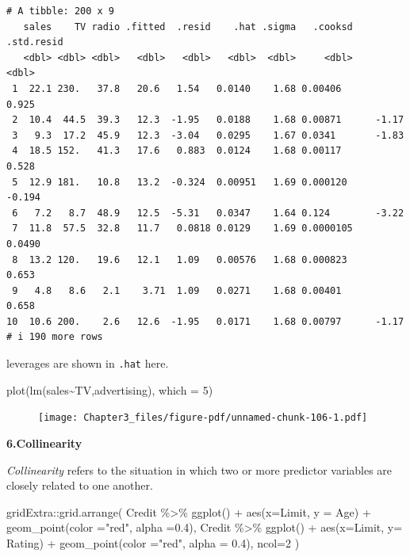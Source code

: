 \documentclass[
  letterpaper,
  DIV=11,
  numbers=noendperiod]{scrreprt}
\newenvironment{Shaded}{\begin{snugshade}}{\end{snugshade}}
\newcommand{\AttributeTok}[1]{\textcolor[rgb]{0.65,0.35,0.00}{#1}}
\newcommand{\DecValTok}[1]{\textcolor[rgb]{0.47,0.16,0.63}{#1}}
\newcommand{\FloatTok}[1]{\textcolor[rgb]{0.65,0.35,0.00}{#1}}
\newcommand{\FunctionTok}[1]{\textcolor[rgb]{0.02,0.16,0.49}{#1}}
\newcommand{\NormalTok}[1]{\textcolor[rgb]{0.33,0.33,0.33}{#1}}
\newcommand{\SpecialCharTok}[1]{\textcolor[rgb]{0.00,0.46,0.62}{#1}}
\newcommand{\StringTok}[1]{\textcolor[rgb]{0.00,0.50,0.00}{#1}}
\begin{document}
\begin{verbatim}
# A tibble: 200 x 9
   sales    TV radio .fitted  .resid    .hat .sigma   .cooksd .std.resid
   <dbl> <dbl> <dbl>   <dbl>   <dbl>   <dbl>  <dbl>     <dbl>      <dbl>
 1  22.1 230.   37.8   20.6   1.54   0.0140    1.68 0.00406       0.925 
 2  10.4  44.5  39.3   12.3  -1.95   0.0188    1.68 0.00871      -1.17  
 3   9.3  17.2  45.9   12.3  -3.04   0.0295    1.67 0.0341       -1.83  
 4  18.5 152.   41.3   17.6   0.883  0.0124    1.68 0.00117       0.528 
 5  12.9 181.   10.8   13.2  -0.324  0.00951   1.69 0.000120     -0.194 
 6   7.2   8.7  48.9   12.5  -5.31   0.0347    1.64 0.124        -3.22  
 7  11.8  57.5  32.8   11.7   0.0818 0.0129    1.69 0.0000105     0.0490
 8  13.2 120.   19.6   12.1   1.09   0.00576   1.68 0.000823      0.653 
 9   4.8   8.6   2.1    3.71  1.09   0.0271    1.68 0.00401       0.658 
10  10.6 200.    2.6   12.6  -1.95   0.0171    1.68 0.00797      -1.17  
# i 190 more rows
\end{verbatim}

leverages are shown in \texttt{.hat} here.

\begin{Shaded}
\begin{Highlighting}[]
\FunctionTok{plot}\NormalTok{(}\FunctionTok{lm}\NormalTok{(sales}\SpecialCharTok{\textasciitilde{}}\NormalTok{TV,advertising), }\AttributeTok{which =} \DecValTok{5}\NormalTok{)}
\end{Highlighting}
\end{Shaded}

\begin{figure}[H]

{\centering \texttt{[image: Chapter3\_files/figure-pdf/unnamed-chunk-106-1.pdf]}

}

\end{figure}

\textbf{6.Collinearity}

\emph{Collinearity} refers to the situation in which two or more
predictor variables are closely related to one another.

\begin{Shaded}
\begin{Highlighting}[]
\NormalTok{gridExtra}\SpecialCharTok{::}\FunctionTok{grid.arrange}\NormalTok{(}
\NormalTok{  Credit }\SpecialCharTok{\%\textgreater{}\%} \FunctionTok{ggplot}\NormalTok{() }\SpecialCharTok{+} \FunctionTok{aes}\NormalTok{(}\AttributeTok{x=}\NormalTok{Limit, }\AttributeTok{y =}\NormalTok{ Age) }\SpecialCharTok{+} \FunctionTok{geom\_point}\NormalTok{(}\AttributeTok{color =}\StringTok{"red"}\NormalTok{, }\AttributeTok{alpha =}\FloatTok{0.4}\NormalTok{),}
\NormalTok{  Credit }\SpecialCharTok{\%\textgreater{}\%} \FunctionTok{ggplot}\NormalTok{() }\SpecialCharTok{+} \FunctionTok{aes}\NormalTok{(}\AttributeTok{x=}\NormalTok{Limit, }\AttributeTok{y=}\NormalTok{ Rating) }\SpecialCharTok{+} \FunctionTok{geom\_point}\NormalTok{(}\AttributeTok{color =}\StringTok{"red"}\NormalTok{, }\AttributeTok{alpha =} \FloatTok{0.4}\NormalTok{),}
  \AttributeTok{ncol=}\DecValTok{2}
\NormalTok{)}
\end{Highlighting}
\end{Shaded}
\end{document}
